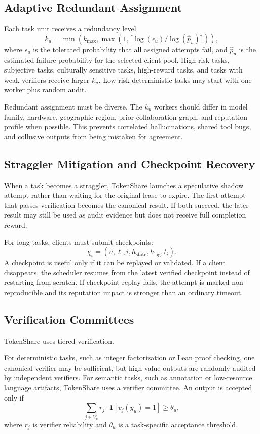 \documentclass{article}
\theoremstyle{plain}
\begin{document}
\subsection{Adaptive Redundant Assignment}

Each task unit receives a redundancy level
\[
k_u=\min(k_{\max},\max(1,\lceil \log(\epsilon_u)/\log(\hat{p}_u)\rceil)),
\]
where $\epsilon_u$ is the tolerated probability that all assigned attempts fail, and $\hat{p}_u$ is the estimated failure probability for the selected client pool. High-risk tasks, subjective tasks, culturally sensitive tasks, high-reward tasks, and tasks with weak verifiers receive larger $k_u$. Low-risk deterministic tasks may start with one worker plus random audit.

Redundant assignment must be diverse. The $k_u$ workers should differ in model family, hardware, geographic region, prior collaboration graph, and reputation profile when possible. This prevents correlated hallucinations, shared tool bugs, and collusive outputs from being mistaken for agreement.

\subsection{Straggler Mitigation and Checkpoint Recovery}

When a task becomes a straggler, TokenShare launches a speculative shadow attempt rather than waiting for the original lease to expire. The first attempt that passes verification becomes the canonical result. If both succeed, the later result may still be used as audit evidence but does not receive full completion reward.

For long tasks, clients must submit checkpoints:
\[
\chi_i=(u,\ell,i,h_{\mathrm{state}},h_{\mathrm{log}},t_i).
\]
A checkpoint is useful only if it can be replayed or validated. If a client disappears, the scheduler resumes from the latest verified checkpoint instead of restarting from scratch. If checkpoint replay fails, the attempt is marked non-reproducible and its reputation impact is stronger than an ordinary timeout.

\subsection{Verification Committees}

TokenShare uses tiered verification.

For deterministic tasks, such as integer factorization or Lean proof checking, one canonical verifier may be sufficient, but high-value outputs are randomly audited by independent verifiers. For semantic tasks, such as annotation or low-resource language artifacts, TokenShare uses a verifier committee. An output is accepted only if
\[
\sum_{j\in V_u} r_j \cdot \mathbf{1}[v_j(y_u)=1] \geq \theta_u,
\]
where $r_j$ is verifier reliability and $\theta_u$ is a task-specific acceptance threshold.
\end{document}

